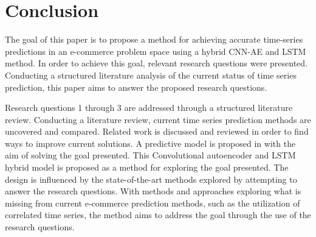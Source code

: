 \section{Conclusion}
\label{section:Discussion:Clonclusion}


The goal of this paper is to propose a method for achieving accurate time-series predictions in an e-commerce
problem space using a hybrid CNN-AE and LSTM method.
In order to achieve this goal, relevant research questions were presented.
Conducting a structured literature analysis of the current status of time series prediction,
this paper aims to answer the proposed research questions.

Research questions 1 through 3 are addressed through a structured literature review.
Conducting a literature review, current time series prediction methods are uncovered and compared.
Related work is discussed and reviewed in order to find ways to improve current solutions.
A predictive model is proposed in  with the aim of solving the goal presented.
This Convolutional autoencoder and LSTM hybrid model is proposed as a method for exploring the goal presented.
The design is influenced by the state-of-the-art methods explored by attempting to answer the research questions.
With methods and approaches exploring what is missing from current e-commerce prediction methods,
such as the utilization of correlated time series, the method aims to address the goal through the use of the research questions.


 